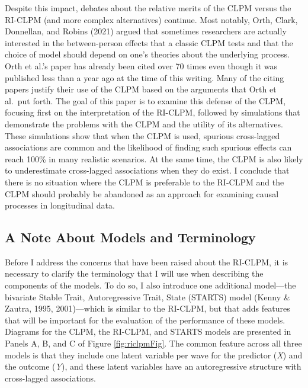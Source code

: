 \documentclass[
  english,
  man,floatsintext]{apa6}
\begin{document}
Despite this impact, debates about the relative merits of the CLPM versus the RI-CLPM (and more complex alternatives) continue. Most notably, Orth, Clark, Donnellan, and Robins (2021) argued that sometimes researchers are actually interested in the between-person effects that a classic CLPM tests and that the choice of model should depend on one's theories about the underlying process. Orth et al.'s paper has already been cited over 70 times even though it was published less than a year ago at the time of this writing. Many of the citing papers justify their use of the CLPM based on the arguments that Orth et al.~put forth. The goal of this paper is to examine this defense of the CLPM, focusing first on the interpretation of the RI-CLPM, followed by simulations that demonstrate the problems with the CLPM and the utility of its alternatives. These simulations show that when the CLPM is used, spurious cross-lagged associations are common and the likelihood of finding such spurious effects can reach 100\% in many realistic scenarios. At the same time, the CLPM is also likely to underestimate cross-lagged associations when they do exist. I conclude that there is no situation where the CLPM is preferable to the RI-CLPM and the CLPM should probably be abandoned as an approach for examining causal processes in longitudinal data.

\hypertarget{a-note-about-models-and-terminology}{%
\subsection{A Note About Models and Terminology}\label{a-note-about-models-and-terminology}}

Before I address the concerns that have been raised about the RI-CLPM, it is necessary to clarify the terminology that I will use when describing the components of the models. To do so, I also introduce one additional model---the bivariate Stable Trait, Autoregressive Trait, State (STARTS) model (Kenny \& Zautra, 1995, 2001)---which is similar to the RI-CLPM, but that adds features that will be important for the evaluation of the performance of these models. Diagrams for the CLPM, the RI-CLPM, and STARTS models are presented in Panels A, B, and C of Figure \ref{fig:riclpmFig}. The common feature across all three models is that they include one latent variable per wave for the predictor (\emph{X}) and the outcome (\emph{Y}), and these latent variables have an autoregressive structure with cross-lagged associations.
\end{document}
